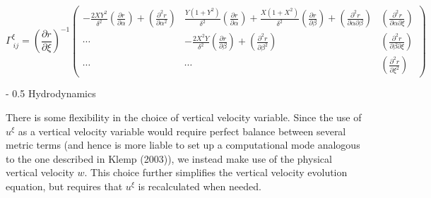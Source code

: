 \documentclass{article}
\makeatletter
\renewcommand\section{\@startsection
  {section}{2}{0mm}%
  {-\baselineskip}%
  {0.5\baselineskip}%
  {\normalfont\Huge\bfseries}}%
\newcommand{\pdiff}[2]{\frac{\partial #1}{\partial #2}}
\makeatother
\begin{document}
\begin{equation}
\Gamma^{\xi}_{\ i j} = \left( \pdiff{r}{\xi} \right)^{-1} \left( \begin{array}{ccc} \displaystyle - \frac{2 X Y^2}{\delta^2} \left( \pdiff{r}{\alpha} \right) + \left( \frac{\partial^2 r}{\partial \alpha^2} \right) & \displaystyle \frac{Y (1+Y^2)}{\delta^2} \left( \pdiff{r}{\alpha} \right) + \frac{X (1+X^2)}{\delta^2} \left( \pdiff{r}{\beta} \right) + \left( \frac{\partial^2 r}{\partial \alpha \partial \beta} \right) & \displaystyle \left( \frac{\partial^2 r}{\partial \alpha \partial \xi} \right) \\[4.0ex] \cdots & \displaystyle - \frac{2 X^2 Y}{\delta^2} \left( \pdiff{r}{\beta} \right) + \left( \frac{\partial^2 r}{\partial \beta^2} \right) & \displaystyle \left( \frac{\partial^2 r}{\partial \beta \partial \xi} \right) \\[4.0ex] \cdots & \cdots & \displaystyle \left( \frac{\partial^2 r}{\partial \xi^2} \right)  \end{array} \right)
\end{equation}

\section{Hydrodynamics}

There is some flexibility in the choice of vertical velocity variable.  Since the use of $u^\xi$ as a vertical velocity variable would require perfect balance between several metric terms (and hence is more liable to set up a computational mode analogous to the one described in Klemp (2003)), we instead make use of the physical vertical velocity $w$.  This choice further simplifies the vertical velocity evolution equation, but requires that $u^\xi$ is recalculated when needed.
\end{document}
